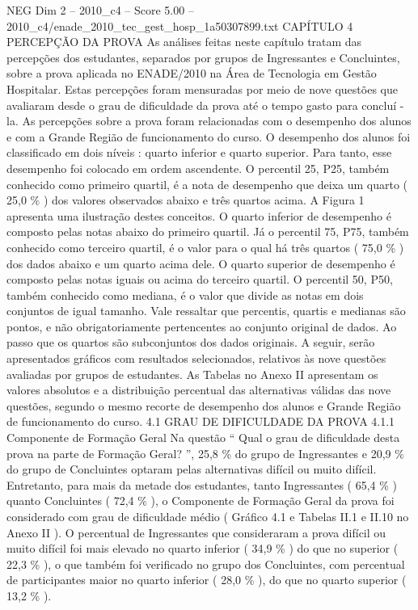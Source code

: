\begin{textsample}{NEG Dim 2 – 2010\_c4 – Score 5.00 – 2010\_c4/enade\_2010\_tec\_gest\_hosp\_1a50307899.txt}  \label{ex:f2_neg_287}
CAPÍTULO 4 PERCEPÇÃO DA PROVA As análises feitas neste capítulo tratam das percepções dos estudantes, separados por grupos de Ingressantes e Concluintes, sobre a prova aplicada no ENADE/2010 na Área de Tecnologia em Gestão Hospitalar.
Estas percepções foram mensuradas por meio de nove questões que avaliaram desde o grau de dificuldade da prova até o tempo gasto para concluí -la.
As percepções sobre a prova foram relacionadas com o desempenho dos alunos e com a Grande Região de funcionamento do curso.
O desempenho dos alunos foi classificado em dois níveis : quarto inferior e quarto superior.
Para tanto, esse desempenho foi colocado em ordem ascendente.
O percentil 25, P25, também conhecido como primeiro quartil, é a nota de desempenho que deixa um quarto ( 25,0 \% ) dos valores observados abaixo e três quartos acima.
A Figura 1 apresenta uma ilustração destes conceitos.
O quarto inferior de desempenho é composto pelas notas abaixo do primeiro quartil.
Já o percentil 75, P75, também conhecido como terceiro quartil, é o valor para o qual há três quartos ( 75,0 \% ) dos dados abaixo e um quarto acima dele.
O quarto superior de desempenho é composto pelas notas iguais ou acima do terceiro quartil.
O percentil 50, P50, também conhecido como mediana, é o valor que divide as notas em dois conjuntos de igual tamanho.
Vale ressaltar que percentis, quartis e medianas são pontos, e não obrigatoriamente pertencentes ao conjunto original de dados.
Ao passo que os quartos são subconjuntos dos dados originais.
A seguir, serão apresentados gráficos com resultados selecionados, relativos às nove questões avaliadas por grupos de estudantes.
As Tabelas no Anexo II apresentam os valores absolutos e a distribuição percentual das alternativas válidas das nove questões, segundo o mesmo recorte de desempenho dos alunos e Grande Região de funcionamento do curso. 4.1 GRAU DE DIFICULDADE DA PROVA 4.1.1 Componente de Formação Geral Na questão “ Qual o grau de dificuldade desta prova na parte de Formação Geral? ”, 25,8 \% do grupo de Ingressantes e 20,9 \% do grupo de Concluintes optaram pelas alternativas difícil ou muito difícil.
Entretanto, para mais da metade dos estudantes, tanto Ingressantes ( 65,4 \% ) quanto Concluintes ( 72,4 \% ), o Componente de Formação Geral da prova foi considerado com grau de dificuldade médio ( Gráfico 4.1 e Tabelas II.1 e II.10 no Anexo II ).
O percentual de Ingressantes que consideraram a prova difícil ou muito difícil foi mais elevado no quarto inferior ( 34,9 \% ) do que no superior ( 22,3 \% ), o que também foi verificado no grupo dos Concluintes, com percentual de participantes maior no quarto inferior ( 28,0 \% ), do que no quarto superior ( 13,2 \% ).

\end{textsample}
